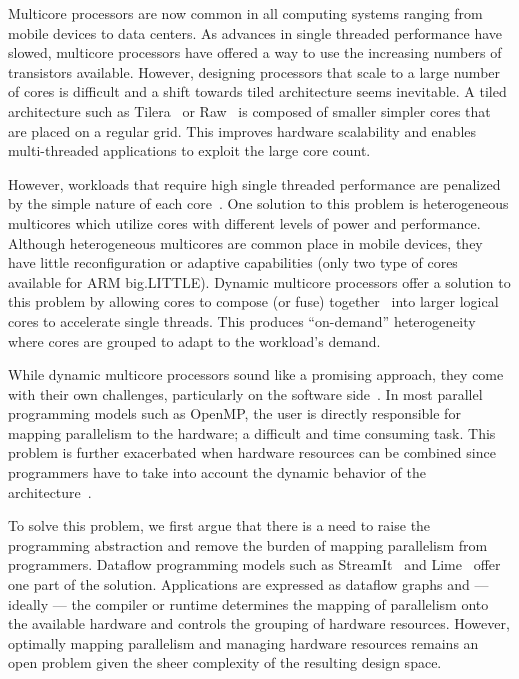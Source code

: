 Multicore processors are now common in all computing systems ranging from mobile devices to data centers.
As advances in single threaded performance have slowed, multicore processors have offered a way to use the increasing numbers of transistors available.
However, designing processors that scale to a large number of cores is difficult and a shift towards tiled architecture seems inevitable.
A tiled architecture such as Tilera~\cite{bell2008tile} or Raw~\cite{waingold1997raw} is composed of smaller simpler cores that are placed on a regular grid.
This improves hardware scalability and enables multi-threaded applications to exploit the large core count.

However, workloads that require high single threaded performance are penalized by the simple nature of each core~\cite{eyerman2010amdahl}.
One solution to this problem is heterogeneous multicores which utilize cores with different levels of power and performance.
Although heterogeneous multicores are common place in mobile devices, they have little reconfiguration or adaptive capabilities (\eg only two type of cores available for ARM big.LITTLE).
Dynamic multicore processors offer a solution to this problem by allowing cores to compose (or fuse) together~\cite{ipek2007CoreFusion} into larger logical cores to accelerate single threads.
This produces ``on-demand'' heterogeneity where cores are grouped to adapt to the workload's demand.

While dynamic multicore processors sound like a promising approach, they come with their own challenges, particularly on the software side~\cite{wells2009needfordmc}.
In most parallel programming models such as OpenMP, the user is directly responsible for mapping parallelism to the hardware; a difficult and time consuming task.
This problem is further exacerbated when hardware resources can be combined since programmers have to take into account the dynamic behavior of the architecture~\cite{bower2008impactd}.

To solve this problem, we first argue that there is a need to raise the programming abstraction and remove the burden of mapping parallelism from programmers.
Dataflow programming models such as StreamIt~\cite{theis2002streamit} and Lime~\cite{auerbach2012lime} offer one part of the solution.
Applications are expressed as dataflow graphs and --- ideally --- the compiler or runtime determines the mapping of parallelism onto the available hardware and controls the grouping of hardware resources.
However, optimally mapping parallelism and managing hardware resources remains an open problem given the sheer complexity of the resulting design space.

